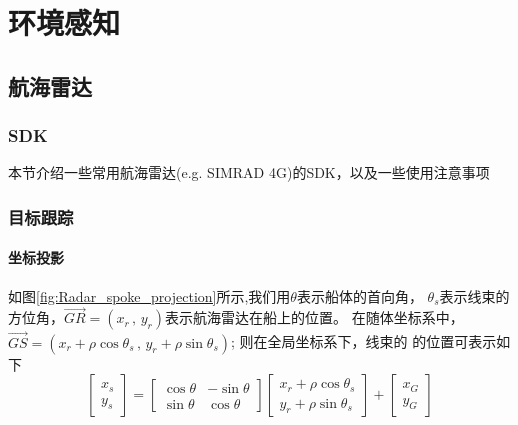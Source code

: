 
\chapter{环境感知}
\label{chap:chapter05}

\section{航海雷达}
\label{sec:marineradar}

\subsection{SDK}
本节介绍一些常用航海雷达(e.g. SIMRAD 4G)的SDK，以及一些使用注意事项
\subsection{目标跟踪}
\subsubsection{坐标投影}
如图\ref{fig:Radar_spoke_projection}所示,我们用$\theta$表示船体的首向角，
$\theta_s$表示线束的方位角，$\overrightarrow{GR}=
(x_r \, , \,  y_r)$表示航海雷达在船上的位置。
在随体坐标系中，$\overrightarrow{GS}=
(x_r+\rho \cos \theta_s \, , \, y_r+\rho \sin \theta_s )$; 则在全局坐标系下，线束的
的位置可表示如下
\begin{equation}
  \begin{bmatrix}
    x_s \\
    y_s
  \end{bmatrix}=
  \begin{bmatrix}
    \cos \theta & -\sin \theta \\
    \sin \theta & \cos \theta
  \end{bmatrix}
  \begin{bmatrix}
    x_r + \rho \cos \theta_s \\
    y_r + \rho \sin \theta_s
  \end{bmatrix} +
  \begin{bmatrix}
    x_G \\
    y_G
  \end{bmatrix}
\end{equation}

